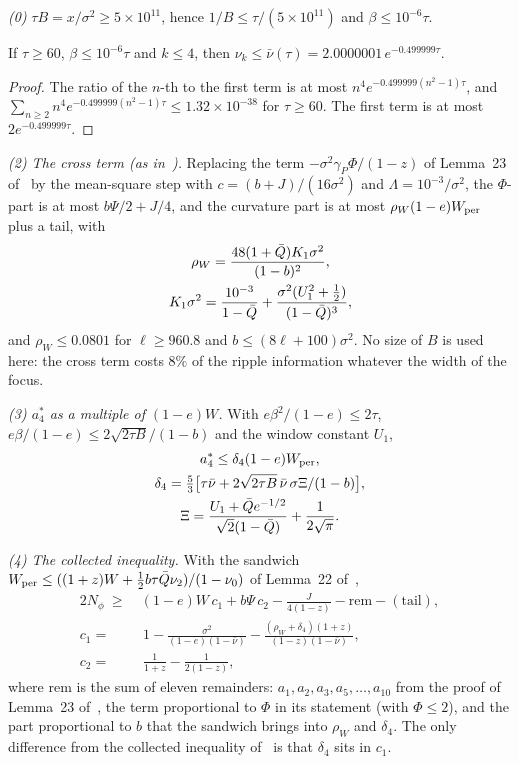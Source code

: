 \emph{(0)} $\tau B=x/\sigma^2\ge5\times10^{11}$, hence $1/B\le\tau/(5\times10^{11})$ and $\beta\le10^{-6}\tau$.

\begin{lemma} \proofst
\label{lem:nu}
If $\tau\ge60$, $\beta\le10^{-6}\tau$ and $k\le4$, then $\nu_k\le\bar\nu(\tau)=2.0000001\,e^{-0.499999\tau}$.
\end{lemma}
\begin{proof}
The ratio of the $n$-th to the first term is at most $n^4e^{-0.499999(n^2-1)\tau}$, and $\sum_{n\ge2}n^4e^{-0.499999(n^2-1)\tau}\le1.32\times10^{-38}$ for $\tau\ge60$. The first term is at most $2e^{-0.499999\tau}$.
\end{proof}

\emph{(2) The cross term (as in~\cite{H}).}
Replacing the term $-\sigma^2\gamma_P\Phi/(1-z)$ of Lemma~23 of~\cite{F} by the mean-square step with $c=(b+J)/(16\sigma^2)$ and $\Lambda=10^{-3}/\sigma^2$, the $\Phi$-part is at most $b\Psi/2+J/4$, and the curvature part is at most $\rho_W(1-e)W_{\rm per}$ plus a tail, with
\begin{gather}
\rho_W=\frac{48(1+\bar Q)K_1\sigma^2}{(1-b)^2},\nonumber\\ K_1\sigma^2=\frac{10^{-3}}{1-\bar Q}+\frac{\sigma^2(U_1^2+\frac12)}{(1-\bar Q)^3},
\end{gather}
and $\rho_W\le0.0801$ for $\ell\ge960.8$ and $b\le(8\ell+100)\sigma^2$.
No size of $B$ is used here: the cross term costs $8\%$ of the ripple information whatever the width of the focus.

\emph{(3) $a_4^*$ as a multiple of $(1-e)W$.}
With $e\beta^2/(1-e)\le2\tau$, $e\beta/(1-e)\le2\sqrt{2\tau B}/(1-b)$ and the window constant $U_1$,
\begin{gather}
a_4^*\le\delta_4(1-e)W_{\rm per},\nonumber\\ \delta_4=\tfrac53\bigl[\tau\bar\nu+2\sqrt{2\tau B}\,\bar\nu\,\sigma\Xi/(1-b)\bigr],\nonumber\\ \Xi=\frac{U_1+\bar Q e^{-1/2}}{\sqrt2(1-\bar Q)}+\frac1{2\sqrt\pi}.
\end{gather}

\emph{(4) The collected inequality.}
With the sandwich $W_{\rm per}\le((1+z)W+\tfrac12b\tau\bar Q\nu_2)/(1-\nu_0)$ of Lemma~22 of~\cite{F},
\begin{equation}
\begin{aligned}
2N_\phi\ \ge\ &(1-e)W\,c_1+b\Psi\,c_2-\frac J{4(1-z)}-\mathrm{rem}-(\text{tail}),\\
c_1=&\,1-\frac{\sigma^2}{(1-e)(1-\bar\nu)}-\frac{(\rho_W+\delta_4)(1+z)}{(1-z)(1-\bar\nu)},\\ c_2=&\,\frac1{1+z}-\frac1{2(1-z)},
\end{aligned}
\end{equation}
where rem is the sum of eleven remainders: $a_1,a_2,a_3,a_5,\ldots,a_{10}$ from the proof of Lemma~23 of~\cite{F}, the term proportional to $\Phi$ in its statement (with $\Phi\le2$), and the part proportional to $b$ that the sandwich brings into $\rho_W$ and $\delta_4$.
The only difference from the collected inequality of~\cite{H} is that $\delta_4$ sits in $c_1$.

